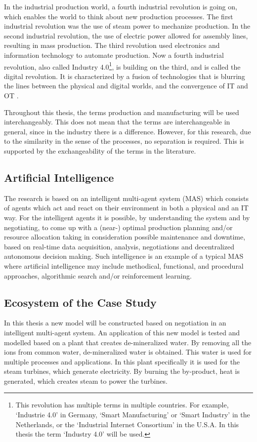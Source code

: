 In the industrial production world, a fourth industrial revolution is going on, which enables the world to think about new production processes. The first industrial revolution was the use of steam power to mechanize production. In the second industrial revolution, the use of electric power allowed for assembly lines, resulting in mass production. The third revolution used electronics and information technology to automate production. Now a fourth industrial revolution, also called Industry 4.0\footnote{This revolution has multiple terms in multiple countries. For example, `Industrie 4.0' in Germany, `Smart Manufacturing' or `Smart Industry' in the Netherlands, or the `Industrial Internet Consortium' in the U.S.A. In this thesis the term `Industry 4.0' will be used.}, is building on the third, and is called the digital revolution. It is characterized by a fusion of technologies that is blurring the lines between the physical and digital worlds, and the convergence of IT and OT \citep{leitao2016smart}.

Throughout this thesis, the terms production and manufacturing will be used interchangeably. This does not mean that the terms are interchangeable in general, since in the industry there is a difference. However, for this research, due to the similarity in the sense of the processes, no separation is required. This is supported by the exchangeability of the terms in the literature. 

\subsection{Artificial Intelligence}
The research is based on an intelligent multi-agent system (MAS) which consists of agents which act and react on their environment in both a physical and an IT way. For the intelligent agents it is possible, by understanding the system and by negotiating, to come up with a (near-) optimal production planning and/or resource allocation  taking in consideration possible maintenance and downtime, based on real-time data acquisition, analysis, negotiations and decentralized autonomous decision making. Such intelligence is an example of a typical MAS where artificial intelligence may include methodical, functional, and procedural approaches, algorithmic search and/or reinforcement learning. 

\subsection{Ecosystem of the Case Study}
\label{sec:intro_ecosystem}
In this thesis a new model will be constructed based on negotiation in an intelligent multi-agent system. An application of this new model is tested and modelled based on a plant that creates de-mineralized water. By removing all the ions from common water, de-mineralized water is obtained. This water is used for multiple processes and applications. In this plant specifically it is used for the steam turbines, which generate electricity. By burning the by-product, heat is generated, which creates steam to power the turbines. 

